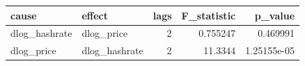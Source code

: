 \begin{tabular}{llrrr}
\toprule
        cause &        effect &  lags &  F\_statistic &     p\_value \\
\midrule
dlog\_hashrate &    dlog\_price &     2 &     0.755247 &    0.469991 \\
   dlog\_price & dlog\_hashrate &     2 &      11.3344 & 1.25155e-05 \\
\bottomrule
\end{tabular}
